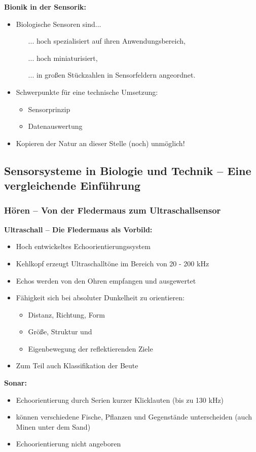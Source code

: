 \textbf{Bionik in der Sensorik:}
\begin{itemize}
\setlength\itemsep{0em}
\item Biologische Sensoren sind...
\begin{itemize}
\setlength\itemsep{0em}
\item[...] hoch spezialisiert auf ihren Anwendungsbereich,
\item[...] hoch miniaturisiert,
\item[...] in großen \glqq Stückzahlen\grqq{} in Sensorfeldern angeordnet.
\end{itemize}
\item Schwerpunkte für eine technische Umsetzung:
\begin{itemize}
\setlength\itemsep{0em}
\item Sensorprinzip
\item Datenauswertung
\end{itemize}
\item Kopieren der Natur an dieser Stelle (noch) unmöglich!
\end{itemize}
\subsection{Sensorsysteme in Biologie und Technik – Eine vergleichende Einführung}
\subsubsection{Hören – Von der Fledermaus zum Ultraschallsensor}
\textbf{Ultraschall – Die Fledermaus als Vorbild:}
\begin{itemize}
\setlength\itemsep{0em}
\item Hoch entwickeltes Echoorientierungssystem
\item Kehlkopf erzeugt Ultraschalltöne im Bereich von 20 - 200 kHz
\item Echos werden von den Ohren empfangen und ausgewertet
\item Fähigkeit sich bei absoluter Dunkelheit zu orientieren:
\begin{itemize}
\setlength\itemsep{0em}
\item Distanz, Richtung, Form
\item Größe, Struktur und
\item Eigenbewegung der reflektierenden Ziele
\end{itemize}
\item Zum Teil auch Klassifikation der Beute
\end{itemize}
\textbf{Sonar:}
\begin{itemize}
\setlength\itemsep{0em}
\item Echoorientierung durch Serien kurzer Klicklauten (bis zu 130 kHz)
\item können verschiedene Fische, Pflanzen und Gegenstände unterscheiden (auch Minen unter dem Sand)
\item Echoorientierung nicht angeboren
\end{itemize}

